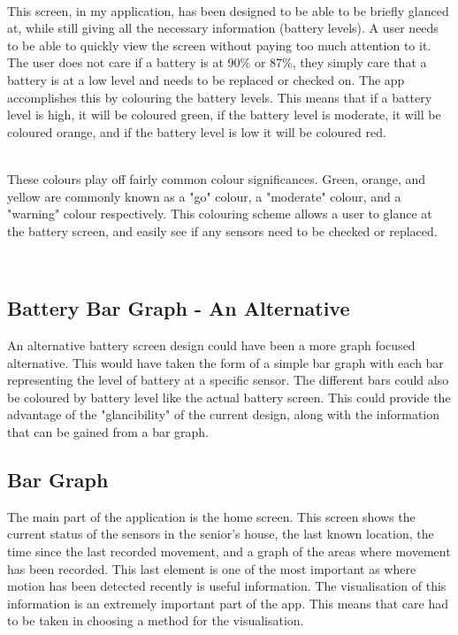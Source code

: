 \documentclass[a4paper, 11pt]{article}
\begin{document}
~\\
This screen, in my application, has been designed to be able to be briefly glanced at, while still giving all the necessary information (battery levels). A user needs to be able to quickly view the screen without paying too much attention to it. The user does not care if a battery is at 90\% or 87\%, they simply care that a battery is at a low level and needs to be replaced or checked on. The app accomplishes this by colouring the battery levels.  This means that if a battery level is high, it will be coloured green, if the battery level is moderate, it will be coloured orange, and if the battery level is low it will be coloured red.

~\\
These colours play off fairly common colour significances. Green, orange, and yellow are commonly known as a "go" colour, a "moderate" colour, and a "warning" colour respectively. This colouring scheme allows a user to glance at the battery screen, and easily see if any sensors need to be checked or replaced.


~\\
\subsection{Battery Bar Graph - An Alternative}

An alternative battery screen design could have been a more graph focused alternative. This would have taken the form of a simple bar graph with each bar representing the level of battery at a specific sensor. The different bars could also be coloured by battery level like the actual battery screen. This could provide the advantage of the "glancibility" of the current design, along with the information that can be gained from a bar graph.



\subsection{Bar Graph}

The main part of the application is the home screen. This screen shows the current status of the sensors in the senior's house, the last known location, the time since the last recorded movement, and a graph of the areas where movement has been recorded. This last element is one of the most important as where motion has been detected recently is useful information. The visualisation of this information is an extremely important part of the app. This means that care had to be taken in choosing a method for the visualisation.
\end{document}
